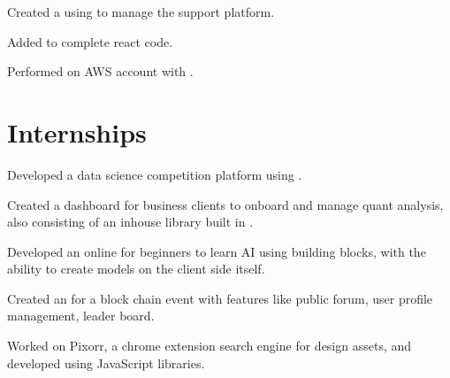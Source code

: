 \documentclass[]{deedy-resume-openfont}
\begin{document}
\begin{minipage}[t]{0.71\textwidth}
\begin{tightemize}
\item Created a  using  to manage the support platform.
\item Added  to complete  react code.
\item Performed  on AWS account with .
\end{tightemize}
\sectionsep

\vspace*{-2mm}
\section{Internships}
\begin{tightemize}
\item Developed a data science competition platform using .
\item Created a dashboard for business clients to onboard and manage quant analysis, also consisting of an inhouse  library built in .
\end{tightemize}
\sectionsep

\begin{tightemize}
\item Developed an online  for beginners to learn AI using building blocks, with the ability to create models on the client side itself.
\item Created an  for a block chain event with features like public forum, user profile management, leader board.
\end{tightemize}
\sectionsep

\begin{tightemize}
\item Worked on Pixorr, a chrome extension search engine for design assets, and developed  using JavaScript libraries.
\end{tightemize}
\sectionsep
\end{minipage} 
\end{document}
